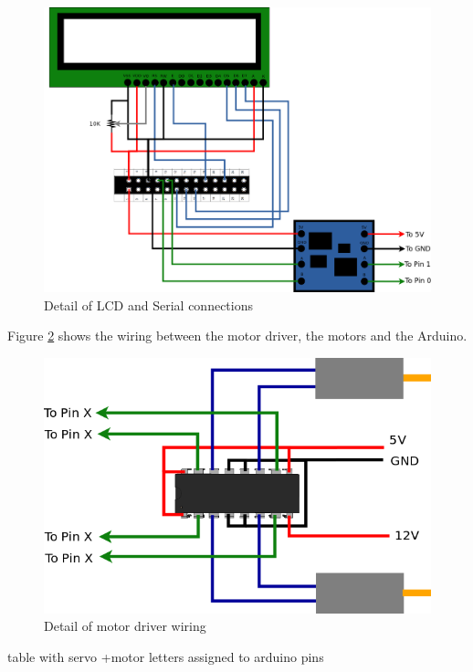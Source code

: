 	\begin{figure}[H]
			\centering
			\includegraphics[width=15cm, angle=0]{images/Diagrams/detail.png}
			\caption{Detail of LCD and Serial connections }
			\label{gpioDetail}
	\end{figure}
	\bigskip


	\bigskip
Figure \ref{hbridgeDetail} shows the wiring between the motor driver, the motors and the Arduino.

	\begin{figure}[H]
			\centering
			\includegraphics[scale=0.5, angle=0]{images/Diagrams/hbridge.png}
			\caption{Detail of motor driver wiring }
			\label{hbridgeDetail}
	\end{figure}
	\bigskip


table with servo +motor letters assigned to arduino pins


